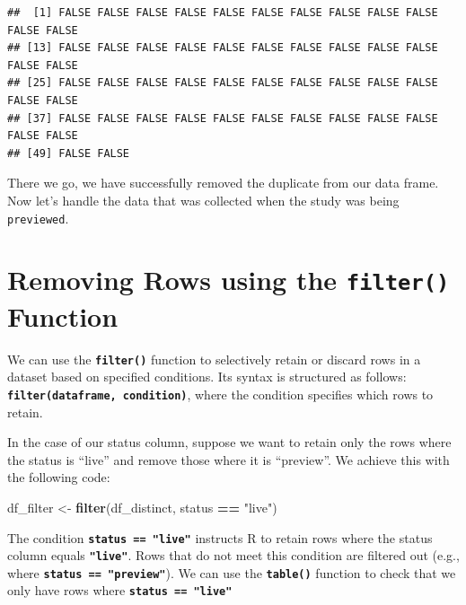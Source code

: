 \documentclass[
]{book}
\newenvironment{Shaded}{\begin{snugshade}}{\end{snugshade}}
\newcommand{\FunctionTok}[1]{\textcolor[rgb]{0.13,0.29,0.53}{\textbf{#1}}}
\newcommand{\NormalTok}[1]{#1}
\newcommand{\OtherTok}[1]{\textcolor[rgb]{0.56,0.35,0.01}{#1}}
\newcommand{\SpecialCharTok}[1]{\textcolor[rgb]{0.81,0.36,0.00}{\textbf{#1}}}
\newcommand{\StringTok}[1]{\textcolor[rgb]{0.31,0.60,0.02}{#1}}
\begin{document}
\begin{verbatim}
##  [1] FALSE FALSE FALSE FALSE FALSE FALSE FALSE FALSE FALSE FALSE FALSE FALSE
## [13] FALSE FALSE FALSE FALSE FALSE FALSE FALSE FALSE FALSE FALSE FALSE FALSE
## [25] FALSE FALSE FALSE FALSE FALSE FALSE FALSE FALSE FALSE FALSE FALSE FALSE
## [37] FALSE FALSE FALSE FALSE FALSE FALSE FALSE FALSE FALSE FALSE FALSE FALSE
## [49] FALSE FALSE
\end{verbatim}

There we go, we have successfully removed the duplicate from our data frame. Now let's handle the data that was collected when the study was being \texttt{previewed}.

\section{\texorpdfstring{Removing Rows using the \texttt{filter()} Function}{Removing Rows using the filter() Function}}\label{removing-rows-using-the-filter-function}

We can use the \textbf{\texttt{filter()}} function to selectively retain or discard rows in a dataset based on specified conditions. Its syntax is structured as follows: \textbf{\texttt{filter(dataframe,\ condition)}}, where the condition specifies which rows to retain.

In the case of our status column, suppose we want to retain only the rows where the status is ``live'' and remove those where it is ``preview''. We achieve this with the following code:

\begin{Shaded}
\begin{Highlighting}[]
\NormalTok{df\_filter }\OtherTok{\textless{}{-}} \FunctionTok{filter}\NormalTok{(df\_distinct, status }\SpecialCharTok{==} \StringTok{"live"}\NormalTok{)}
\end{Highlighting}
\end{Shaded}

The condition \textbf{\texttt{status\ ==\ "live"}} instructs R to retain rows where the status column equals \textbf{\texttt{"live"}}. Rows that do not meet this condition are filtered out (e.g., where \textbf{\texttt{status\ ==\ "preview"}}). We can use the \textbf{\texttt{table()}} function to check that we only have rows where \textbf{\texttt{status\ ==\ "live"}}

\begin{Shaded}
\end{Shaded}
\end{document}
